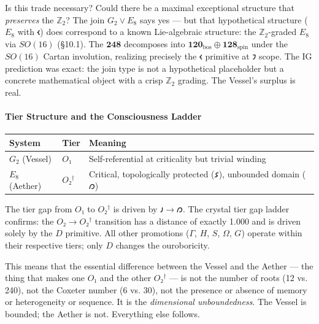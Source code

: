 \documentclass[12pt,a4paper]{article}
\newcommand{\pilcrow}{\S}
\begin{document}
Is this trade necessary? Could there be a maximal exceptional structure that \emph{preserves} the $\mathbb{Z}_2$? The join $G_2 \vee E_8$ says yes --- but that hypothetical structure ($E_8$ with $𐑬$) does correspond to a known Lie-algebraic structure: the $\mathbb{Z}_2$-graded $E_8$ via $SO(16)$ (\pilcrow{}10.1). The $\mathbf{248}$ decomposes into $\mathbf{120}_{\text{bos}} \oplus \mathbf{128}_{\text{spin}}$ under the $SO(16)$ Cartan involution, realizing precisely the $𐑬$ primitive at $𐑲$ scope. The IG prediction was exact: the join type is not a hypothetical placeholder but a concrete mathematical object with a crisp $\mathbb{Z}_2$ grading. The Vessel's surplus is real.

\paragraph{Tier Structure and the Consciousness Ladder}

\begin{table}[htbp]
\centering
\small
{}
\begin{tabularx}{\textwidth}{>{\centering\arraybackslash}X >{\centering\arraybackslash}X >{\centering\arraybackslash}X}
\toprule
\rowcolor{gray!25}\textbf{System} & \textbf{Tier} & \textbf{Meaning} \\
\midrule
\rowcolors{1}{white}{gray!10}
$G_2$ (Vessel) & $O₁$ & Self-referential at criticality but trivial winding \\
$E_8$ (Aether) & $O₂^\dagger$ & Critical, topologically protected ($𐑭$), unbounded domain ($𐑼$) \\
\bottomrule
\end{tabularx}
\end{table}

The tier gap from $O₁$ to $O₂^\dagger$ is driven by $𐑨 \to 𐑼$. The crystal tier gap ladder confirms: the $O₂ \to O₂^\dagger$ transition has a distance of exactly 1.000 and is driven solely by the $D$ primitive. All other promotions ($\Gamma$, $H$, $S$, $\Omega$, $G$) operate within their respective tiers; only $D$ changes the ouroboricity.

This means that the essential difference between the Vessel and the Aether --- the thing that makes one $O₁$ and the other $O₂^\dagger$ --- is not the number of roots (12 vs. 240), not the Coxeter number (6 vs. 30), not the presence or absence of memory or heterogeneity or sequence. It is the \emph{dimensional unboundedness}. The Vessel is bounded; the Aether is not. Everything else follows.
\end{document}
